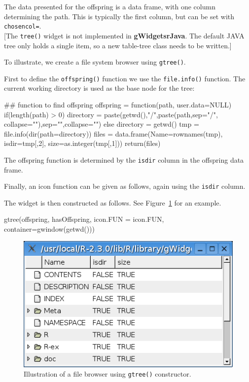 \documentclass[12pt]{article}
\newcommand{\RCode}[1]{\texttt{#1}}
\newcommand{\RFunc}[1]{\texttt{#1()}}
\newcommand{\RPackage}[1]{\textbf{#1}}
\newcommand{\RArg}[1]{\texttt{#1=}}
\begin{document}
The data presented for the offspring is a data frame, with one column
determining the path. This is typically the first column, but can be
set with \RArg{chosencol}.
\\

[The \RFunc{tree} widget is not implemented in
\RPackage{gWidgetsrJava}. The default JAVA tree only holds a single
item, so a new table-tree class needs to be written.]

To illustrate, we create a file system browser using
\RFunc{gtree}.

First to define the \RFunc{offspring} function we use the
\RFunc{file.info} function. The current working directory is used as
the base node for the tree:

\begin{Scode}
  ## function to find offspring
  offspring = function(path, user.data=NULL) {
    if(length(path) > 0) 
    directory = paste(getwd(),"/",paste(path,sep="/", collapse=""),sep="",collapse="")
    else
    directory = getwd()
    tmp = file.info(dir(path=directory))
    files = data.frame(Name=rownames(tmp), isdir=tmp[,2], size=as.integer(tmp[,1]))
    return(files)
  }
\end{Scode}

The offspring function is determined by the \RCode{isdir} column in
the offspring data frame. 

Finally, an icon function can be given as follows, again using the
\RCode{isdir} column.


The widget is then constructed as follows. See
Figure~\ref{fig:filebrowser} for an example.
\begin{Scode}
  gtree(offspring, hasOffspring, icon.FUN = icon.FUN,
  container=gwindow(getwd()))
\end{Scode}

\begin{figure}[htbp]
  \centering
  \includegraphics[width=.6\textwidth]{filebrowser}
  \caption{Illustration of a file browser using \RFunc{gtree} constructor.}
  \label{fig:filebrowser}
\end{figure}
\end{document}
